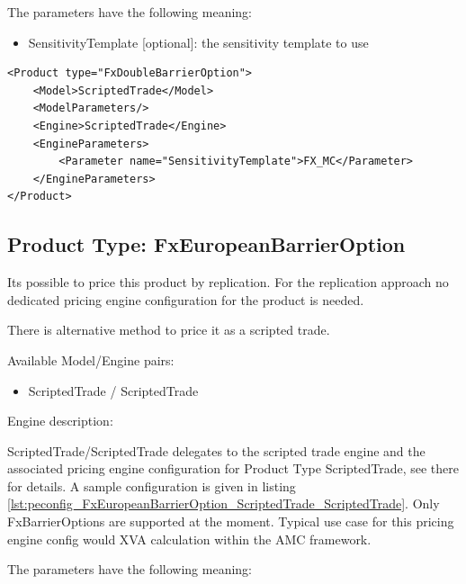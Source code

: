 The parameters have the following meaning:

\begin{itemize}
\item SensitivityTemplate [optional]: the sensitivity template to use
\end{itemize}

\begin{longlisting}
\begin{verbatim}
<Product type="FxDoubleBarrierOption">
    <Model>ScriptedTrade</Model>
    <ModelParameters/>
    <Engine>ScriptedTrade</Engine>
    <EngineParameters>
        <Parameter name="SensitivityTemplate">FX_MC</Parameter>
    </EngineParameters>
</Product>
\end{verbatim}
\caption{Configuration for Product FxDoubleBarrierOption, Model ScriptedTrade, Engine ScriptedTrade}
\label{lst:peconfig_FxDoubleBarrierOption_ScriptedTrade_ScriptedTrade}
\end{longlisting}


\subsection{Product Type: FxEuropeanBarrierOption}

Its possible to price this product by replication. For the replication approach no dedicated pricing engine configuration for the product is needed.

There is alternative method to price it as a scripted trade.

Available Model/Engine pairs: 
\begin{itemize}
    \item ScriptedTrade / ScriptedTrade
\end{itemize}

Engine description:

ScriptedTrade/ScriptedTrade delegates to the scripted trade engine and the associated pricing engine configuration for
Product Type ScriptedTrade, see there for details. A sample configuration is given in listing
\ref{lst:peconfig_FxEuropeanBarrierOption_ScriptedTrade_ScriptedTrade}. Only FxBarrierOptions are supported at the moment.
Typical use case for this pricing engine config would XVA calculation within the AMC framework.

The parameters have the following meaning:

